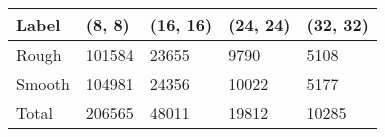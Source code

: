 \begin{tabular}{lllll}
\toprule
Label &  (8, 8) & (16, 16) & (24, 24) & (32, 32) \\
\midrule
Rough  &  101584 &    23655 &     9790 &     5108 \\
Smooth &  104981 &    24356 &    10022 &     5177 \\
Total  &  206565 &    48011 &    19812 &    10285 \\
\bottomrule
\end{tabular}
